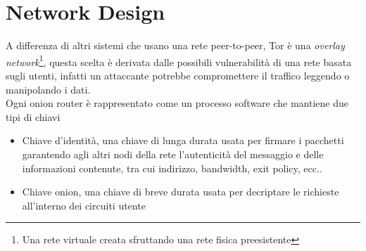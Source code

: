 \section{Network Design}
A differenza di altri sistemi che usano una rete peer-to-peer, Tor è una \emph{overlay network}\footnote{Una rete virtuale creata sfruttando una rete fisica preesistente}, questa scelta è derivata dalle possibili vulnerabilità di una rete basata sugli utenti, infatti un attaccante potrebbe compromettere il traffico leggendo o manipolando i dati. \\
Ogni onion router è rappresentato come un processo software che mantiene due tipi di chiavi
\begin{itemize}
    \item Chiave d'identità, una chiave di lunga durata usata per firmare i pacchetti garantendo agli altri nodi della rete l'autenticità del messaggio e delle informazioni contenute, tra cui indirizzo, bandwidth, exit policy, ecc..
    \item Chiave onion, una chiave di breve durata usata per decriptare le richieste all'interno dei circuiti utente
\end{itemize}

